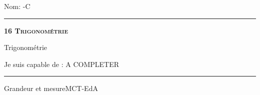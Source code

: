 \documentclass[11pt,a4paper]{article}
\begin{document}
\begin{titlepage}
    \setlength{\topskip}{0mm}
Nom: \hfill \the\year-C
\vspace{0.5cm}
\hrule

    \centering
    \vspace{0.1\textheight}
	{\bfseries\scshape\Huge 16 Trigonométrie\par}
    \vspace{1.5cm}

    {\huge Trigonométrie}
	\vspace{1.5cm}
    
    {\large Je suis capable de :}
    \vspace{1.5cm}
    A COMPLETER

\vfill
\hrule
\vspace{0.5cm}
Grandeur et mesure\hfill MCT-EdA

\end{titlepage}
\end{document}
